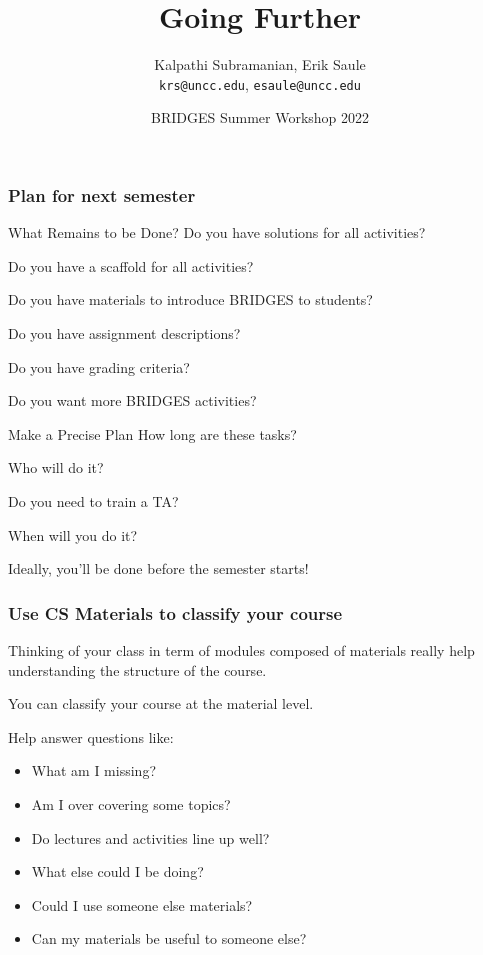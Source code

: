 \documentclass[aspectratio=169]{beamer}
\title{Going Further}
\subtitle{}
\author{Kalpathi Subramanian, Erik Saule\\\texttt{krs@uncc.edu}, \texttt{esaule@uncc.edu}}
\institute{The University of North Carolina at Charlotte}
\date{BRIDGES Summer Workshop 2022}
\begin{document}
\begin{frame}
\titlepage
\end{frame}




\begin{frame}
  \frametitle{Plan for next semester}

  \begin{block}{What Remains to be Done?}
    Do you have solutions for all activities?

    Do you have a scaffold for all activities?

    Do you have materials to introduce BRIDGES to students?

    Do you have assignment descriptions?

    Do you have grading criteria?
    
    Do you want more BRIDGES activities?
  \end{block}

  \begin{block}{Make a Precise Plan}
    How long are these tasks?
    
    Who will do it?

    Do you need to train a TA?

    When will you do it?

    Ideally, you'll be done before the semester starts!
  \end{block}
  
\end{frame}

\begin{frame}
  \frametitle{Use CS Materials to classify your course}

  Thinking of your class in term of modules composed of materials really help understanding the structure of the course.

  You can classify your course at the material level.

  Help answer questions like:
  \begin{itemize}
  \item What am I missing?
  \item Am I over covering some topics?
  \item Do lectures and activities line up well?
  \item What else could I be doing?
  \item Could I use someone else materials?
  \item Can my materials be useful to someone else?
  \end{itemize}
\end{frame}
\end{document}
